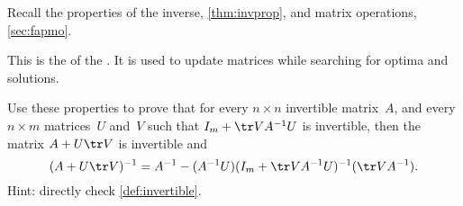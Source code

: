 \begin{exercise} \label{ex:} 
Recall the properties of the inverse, \autoref{thm:invprop}, and matrix operations, \autoref{sec:fapmo}.
\begin{aside}
This is the  of the .  It is used to update matrices while searching for optima and solutions.
\end{aside}%
Use these properties to prove that for every \(n\times n\) invertible matrix~\(A\), and every \(n\times m\) matrices~\(U\) and~\(V\) such that \(I_m+\tr VA^{-1}U\) is invertible, then the matrix \(A+U\tr V\) is invertible and
\begin{equation*}
(A+U\tr V)^{-1}=A^{-1}-(A^{-1}U)(I_m+\tr VA^{-1}U)^{-1}(\tr VA^{-1}).
\end{equation*}
Hint: directly check \autoref{def:invertible}.
\end{exercise}





